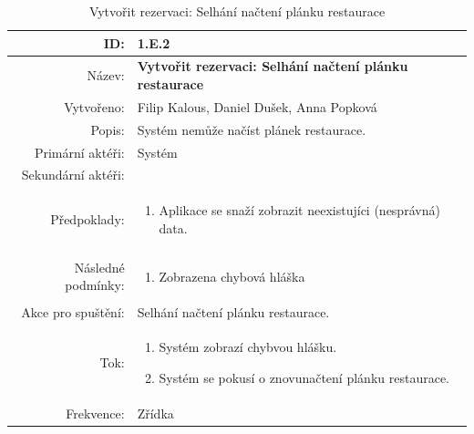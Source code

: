 \documentclass[a4paper,10pt]{article}
\begin{document}
\begin{center}
\begin{table}[ht!]
{\renewcommand{\arraystretch}{1.3}
\begin{tabular}{| r | p{12cm} |}
	\hline
	ID: & 1.E.2 \\
    \hline
    Název: & \textbf{Vytvořit rezervaci: Selhání načtení plánku restaurace} \\
    \hline
    Vytvořeno: & Filip Kalous, Daniel Dušek, Anna Popková \\
    \hline
    Popis: & Systém nemůže načíst plánek restaurace. \\
    \hline
    Primární aktéři: & Systém \\
    \hline
    Sekundární aktéři: &  \\
    \hline
    Předpoklady: & 
    \begin{minipage}[t]{0.75\textwidth}
    	\begin{enumerate}[nosep,after=\strut]
    		\item Aplikace se snaží zobrazit neexistujíci (nesprávná) data.
    	\end{enumerate}
  	\end{minipage} \\
    \hline
    Následné podmínky: & 
    \begin{minipage}[t]{0.75\textwidth}
    	\begin{enumerate}[nosep,after=\strut]
    		\item Zobrazena chybová hláška
    	\end{enumerate}
  	\end{minipage} \\
	\hline
    Akce pro spuštění: & Selhání načtení plánku restaurace. \\
    \hline
    Tok: & 
    \begin{minipage}[t]{0.75\textwidth}
    	\begin{enumerate}[nosep,after=\strut]
        	\item Systém zobrazí chybvou hlášku.
            \item Systém se pokusí o znovunačtení plánku restaurace.
    	\end{enumerate}
  	\end{minipage} \\
    \hline
    Frekvence: & Zřídka \\
    \hline

\end{tabular}}
\caption{Vytvořit rezervaci: Selhání načtení plánku restaurace}
\label{table:3}
\end{table}
\end{center}
\end{document}
